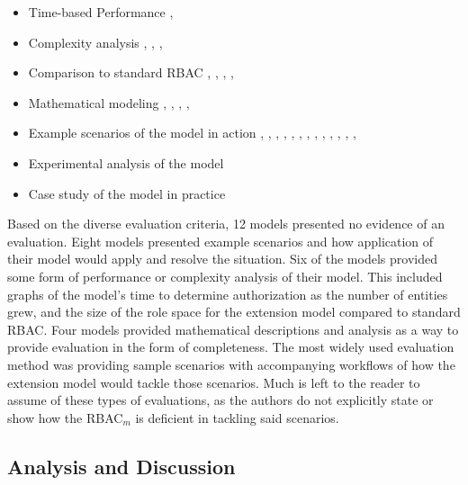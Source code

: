 \begin{itemize}
\setlength{\itemsep}{0.25pt}
\item Time-based Performance \cite{ni2010privacy}, \cite{aich09:role}
\item Complexity analysis \cite{bao08:role}, \cite{zhang06:collaborative}, \cite{chen08:spatio-temporal}, \cite{aich09:role}
\item Comparison to standard RBAC \cite{bao08:role}, \cite{zou2009crbac}, \cite{zhang06:collaborative}, \cite{zhao2008flexible}, \cite{ray07:spatio}
\item Mathematical modeling \cite{damiani2007geo}, \cite{hansen2003spatial}, \cite{aich07:STARBAC}, \cite{chen08:spatio-temporal}, \cite{joshi05:generalized}
\item Example scenarios of the model in action \cite{alam06:constraint}, \cite{tzelepi01:flexible}, \cite{cholewka00:acontext-sensitive}, \cite{huang06:pervasive}, \cite{bao08:role}, \cite{jian2008extended}, \cite{yamazaki04:designing}, \cite{zou2009crbac}, \cite{ray07:spatio}, \cite{samuel07:spatio-temporal}, \cite{joshi05:generalized}, \cite{yao2008task}, \cite{zhou2007team}, \cite{oh2003task}
\item Experimental analysis of the model
\item Case study of the model in practice \cite{motta03:contextual}
\end{itemize}

Based on the diverse evaluation criteria, 12 models presented no evidence of an evaluation. Eight models presented example scenarios
and how application of their model would apply and resolve the situation.  Six of the models provided some form of performance
or complexity analysis of their model.  This included graphs of the model's time to determine authorization as the number of entities
grew, and the size of the role space for the extension model compared to standard RBAC. Four models provided mathematical descriptions
and analysis as a way to provide evaluation in the form of completeness. 
The most widely used evaluation method was providing sample scenarios with accompanying workflows of how the extension model
would tackle those scenarios. Much is left to the reader to assume of these types of evaluations, as the authors do not explicitly state
or show how the RBAC$_{m}$ is deficient in tackling said scenarios.

\subsection{Analysis and Discussion}

